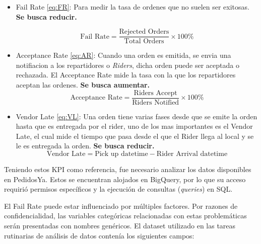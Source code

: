 \begin{itemize}
	\item Fail Rate \eqref{eq:FR}: Para medir la tasa de ordenes que no suelen ser exitosas. \textbf{Se busca reducir.}

	      \begin{equation} \label{eq:FR}
		      \text{Fail Rate} = \frac{\text{Rejected Orders}}{\text{Total Orders}} \times 100\%
	      \end{equation}

	\item Acceptance Rate \eqref{eq:AR}: Cuando una orden es emitida, se envia una notifiacion a los repartidores o \textit{Riders}, dicha orden puede ser aceptada o rechazada. El Acceptance Rate mide la tasa con la que los repartidores aceptan las ordenes. \textbf{Se busca aumentar.}
	      \begin{equation} \label{eq:AR}
		      \text{Acceptance Rate} = \frac{\text{Riders Accept}}{\text{Riders Notified}} \times 100\%
	      \end{equation}
	\item Vendor Late \eqref{eq:VL}: Una orden tiene varias fases desde que se emite la orden hasta que es entregada por el rider, uno de los mas importantes es el Vendor Late, el cual mide el tiempo que pasa desde el que el Rider llega al local y se le es entregada la orden. \textbf{Se busca reducir.}
	      \begin{equation}\label{eq:VL}
		      \text{Vendor Late} = \text{Pick up datetime} - \text{Rider Arrival datetime}
	      \end{equation}
\end{itemize}

Teniendo estos KPI como referencia, fue necesario analizar los datos disponibles en PedidosYa. Estos se encuentran alojados en BigQuery, por lo que su acceso requirió permisos específicos y la ejecución de consultas (\textit{queries}) en SQL.

El Fail Rate puede estar influenciado por múltiples factores. Por razones de confidencialidad, las variables categóricas relacionadas con estas problemáticas serán presentadas con nombres genéricos. El dataset utilizado en las tareas rutinarias de análisis de datos contenía los siguientes campos:

